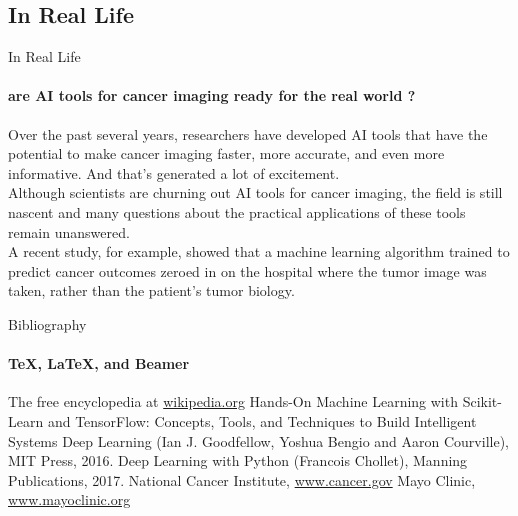 \documentclass{beamer}
\begin{document}
    \subsection{In Real Life}
    \begin{frame}{In Real Life}
      \framesubtitle{are AI tools for cancer imaging ready for the real world ?}
      Over the past several years, researchers have developed AI tools that have the potential to make cancer imaging faster, more accurate, and even more informative. And that’s generated a lot of excitement. \\
      Although scientists are churning out AI tools for cancer imaging, the field is still nascent and many questions about the practical applications of these tools remain unanswered. \\
      A recent study, for example, showed that a machine learning algorithm trained to predict cancer outcomes zeroed in on the hospital where the tumor image was taken, rather than the patient’s tumor biology.
    \end{frame}

\begin{frame}[label=bibliography]{Bibliography}
  \framesubtitle{\TeX, \LaTeX, and Beamer}
  \begin{thebibliography}{9}
    The free encyclopedia at
    \href{https://wikipedia.org}{wikipedia.org}
    Hands-On Machine Learning with Scikit-Learn and TensorFlow: Concepts, Tools, and Techniques to Build Intelligent Systems
    Deep Learning (Ian J. Goodfellow, Yoshua Bengio and Aaron Courville), MIT Press, 2016.
    Deep Learning with Python (Francois Chollet), Manning Publications, 2017.
    National Cancer Institute, \href{https://www.cancer.gov}{www.cancer.gov}
    Mayo Clinic, \href{https://www.mayoclinic.org}{www.mayoclinic.org}
  \end{thebibliography}
\end{frame}
\end{document}
